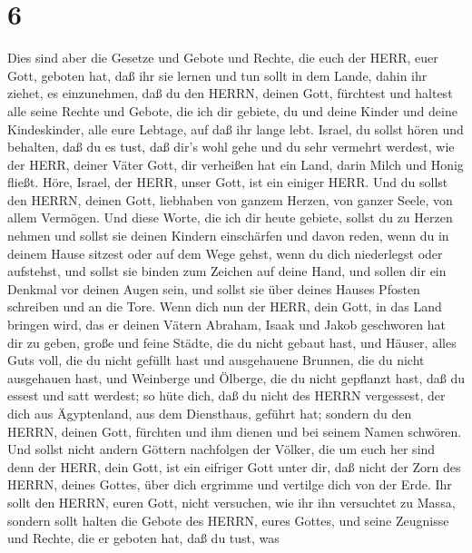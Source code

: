 \hypertarget{section-5}{%
\section{6}\label{section-5}}

 Dies sind aber die Gesetze und Gebote und Rechte, die euch
der HERR, euer Gott, geboten hat, daß ihr sie lernen und tun sollt in
dem Lande, dahin ihr ziehet, es einzunehmen,  daß du den
HERRN, deinen Gott, fürchtest und haltest alle seine Rechte und Gebote,
die ich dir gebiete, du und deine Kinder und deine Kindeskinder, alle
eure Lebtage, auf daß ihr lange lebt.  Israel, du sollst
hören und behalten, daß du es tust, daß dir's wohl gehe und du sehr
vermehrt werdest, wie der HERR, deiner Väter Gott, dir verheißen hat ein
Land, darin Milch und Honig fließt.  Höre, Israel, der HERR,
unser Gott, ist ein einiger HERR.  Und du sollst den HERRN,
deinen Gott, liebhaben von ganzem Herzen, von ganzer Seele, von allem
Vermögen.  Und diese Worte, die ich dir heute gebiete,
sollst du zu Herzen nehmen  und sollst sie deinen Kindern
einschärfen und davon reden, wenn du in deinem Hause sitzest oder auf
dem Wege gehst, wenn du dich niederlegst oder aufstehst, 
und sollst sie binden zum Zeichen auf deine Hand, und sollen dir ein
Denkmal vor deinen Augen sein,  und sollst sie über deines
Hauses Pfosten schreiben und an die Tore.  Wenn dich nun
der HERR, dein Gott, in das Land bringen wird, das er deinen Vätern
Abraham, Isaak und Jakob geschworen hat dir zu geben, große und feine
Städte, die du nicht gebaut hast,  und Häuser, alles Guts
voll, die du nicht gefüllt hast und ausgehauene Brunnen, die du nicht
ausgehauen hast, und Weinberge und Ölberge, die du nicht gepflanzt hast,
daß du essest und satt werdest;  so hüte dich, daß du nicht
des HERRN vergessest, der dich aus Ägyptenland, aus dem Diensthaus,
geführt hat;  sondern du den HERRN, deinen Gott, fürchten
und ihm dienen und bei seinem Namen schwören.  Und sollst
nicht andern Göttern nachfolgen der Völker, die um euch her sind
 denn der HERR, dein Gott, ist ein eifriger Gott unter dir,
daß nicht der Zorn des HERRN, deines Gottes, über dich ergrimme und
vertilge dich von der Erde.  Ihr sollt den HERRN, euren
Gott, nicht versuchen, wie ihr ihn versuchtet zu Massa, 
sondern sollt halten die Gebote des HERRN, eures Gottes, und seine
Zeugnisse und Rechte, die er geboten hat,  daß du tust, was
